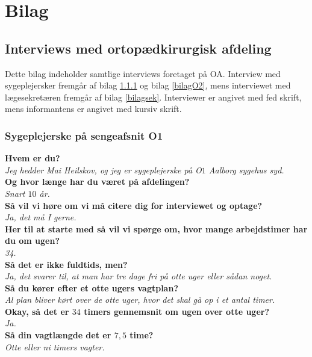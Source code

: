 \chapter{Bilag}

\section{Interviews med ortopædkirurgisk afdeling}
Dette bilag indeholder samtlige interviews foretaget på OA. Interview med sygeplejersker fremgår af bilag \ref{bilagO1} og bilag \ref{bilagO2}, mens interviewet med lægesekretæren fremgår af bilag \ref{bilagsek}. Interviewer er angivet med fed skrift, mens informantens er angivet med kursiv skrift. 

\subsection{Sygeplejerske på sengeafsnit O1} \label{bilagO1}
\textbf{Hvem er du?} \\
\noindent
\textit{Jeg hedder Mai Heilskov, og jeg er sygeplejerske på O$1$ Aalborg sygehus syd. } \\
\noindent
\textbf{Og hvor længe har du været på afdelingen?}\\
\noindent
\textit{Snart $10$ år.} \\
\noindent
\textbf{Så vil vi høre om vi må citere dig for interviewet og optage?}\\
\noindent
\textit{ Ja, det må I gerne.}\\
\noindent
\textbf{Her til at starte med så vil vi spørge om, hvor mange arbejdstimer har du om ugen?} \\
\noindent
\textit{34.} \\
\noindent
\textbf{Så det er ikke fuldtids, men?} \\
\noindent
\textit{Ja, det svarer til, at man har tre dage fri på otte uger eller sådan noget.} \\
\noindent
\textbf{Så du kører efter et otte ugers vagtplan?} \\
\noindent
\textit{Al plan bliver kørt over de otte uger, hvor det skal gå op i et antal timer.} \\
\noindent
\textbf{Okay, så det er $34$ timers gennemsnit om ugen over otte uger?} \\
\noindent
\textit{Ja.} \\
\noindent
\textbf{Så din vagtlængde det er $7,5$ time?} \\
\noindent
\textit{Otte eller ni timers vagter.} \\
